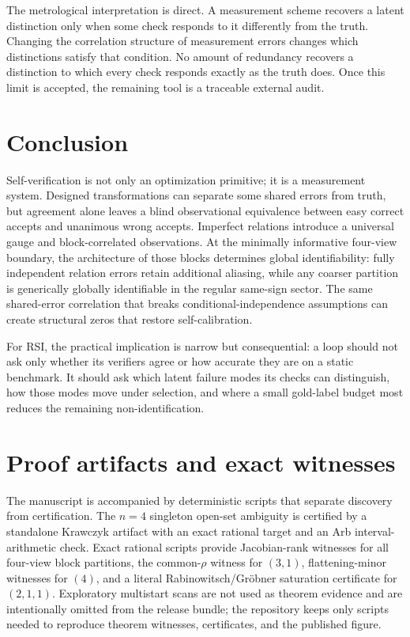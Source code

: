 \documentclass[11pt]{article}
\theoremstyle{definition}
\theoremstyle{remark}
\begin{document}
The metrological interpretation is direct. A measurement scheme recovers a latent distinction only when some check responds to it differently from the truth. Changing the correlation structure of measurement errors changes which distinctions satisfy that condition. No amount of redundancy recovers a distinction to which every check responds exactly as the truth does. Once this limit is accepted, the remaining tool is a traceable external audit.

\section{Conclusion}

Self-verification is not only an optimization primitive; it is a measurement system. Designed transformations can separate some shared errors from truth, but agreement alone leaves a blind observational equivalence between easy correct accepts and unanimous wrong accepts. Imperfect relations introduce a universal gauge and block-correlated observations. At the minimally informative four-view boundary, the architecture of those blocks determines global identifiability: fully independent relation errors retain additional aliasing, while any coarser partition is generically globally identifiable in the regular same-sign sector. The same shared-error correlation that breaks conditional-independence assumptions can create structural zeros that restore self-calibration.

For RSI, the practical implication is narrow but consequential: a loop should not ask only whether its verifiers agree or how accurate they are on a static benchmark. It should ask which latent failure modes its checks can distinguish, how those modes move under selection, and where a small gold-label budget most reduces the remaining non-identification.

\appendix
\section{Proof artifacts and exact witnesses}

The manuscript is accompanied by deterministic scripts that separate discovery from certification. The $n=4$ singleton open-set ambiguity is certified by a standalone Krawczyk artifact with an exact rational target and an Arb interval-arithmetic check. Exact rational scripts provide Jacobian-rank witnesses for all four-view block partitions, the common-$\rho$ witness for $(3,1)$, flattening-minor witnesses for $(4)$, and a literal Rabinowitsch/Gr\"obner saturation certificate for $(2,1,1)$. Exploratory multistart scans are not used as theorem evidence and are intentionally omitted from the release bundle; the repository keeps only scripts needed to reproduce theorem witnesses, certificates, and the published figure.
\end{document}
